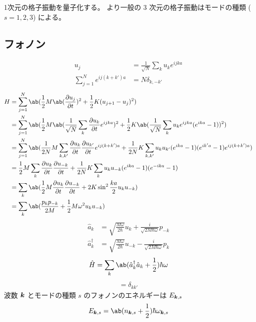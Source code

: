 \documentclass[uplatex,dvipdfmx,a4paper,11pt]{jlreq}
\begin{document}
1次元の格子振動を量子化する。
より一般の 3 次元の格子振動はモードの種類 ($s = 1, 2, 3$) による。

\subsection{フォノン}
\begin{align}
  u_j                            & = \frac{1}{\sqrt{N}}\sum_{k}u_ke^{ijka} \\
  \sum_{j = 1}^N e^{ij(k + k')a} & = N\delta_{k,-k'}
\end{align}
\begin{align}
  H & = \sum_{j = 1}^{N}\ab(\frac{1}{2}M\ab(\diffp{u_j}{t})^2 + \frac{1}{2}K(u_{j+1} - u_j)^2)                                                                                    \\
    & = \sum_{j = 1}^{N}\ab(\frac{1}{2}M\ab(\frac{1}{\sqrt{N}}\sum_{k}\diffp{u_k}{t}e^{ijka})^2 + \frac{1}{2}K\ab(\frac{1}{\sqrt{N}}\sum_{k}u_ke^{ijka}(e^{ika} - 1))^2)          \\
    & = \sum_{j = 1}^{N}\ab(\frac{1}{2N}M\sum_{k,k'}\diffp{u_k}{t}\diffp{u_{k'}}{t}e^{ij(k + k')a} + \frac{1}{2N}K\sum_{k,k'}u_ku_{k'}(e^{ika} - 1)(e^{ik'a} - 1)e^{ij(k + k')a}) \\
    & = \frac{1}{2}M\sum_{k}\diffp{u_k}{t}\diffp{u_{-k}}{t} + \frac{1}{2N}K\sum_{k}u_ku_{-k}(e^{ika} - 1)(e^{-ika} - 1)                                                           \\
    & = \sum_{k}\ab(\frac{1}{2}M\diffp{u_k}{t}\diffp{u_{-k}}{t} + 2K\sin^2\frac{ka}{2}u_ku_{-k})                                                                                  \\
    & = \sum_{k}\ab(\frac{p_{k}p_{-k}}{2M} + \frac{1}{2}M\omega^2u_ku_{-k})
\end{align}
\begin{align}
  \hat{a}_k         & = \sqrt{\frac{M\omega}{2\hbar}}u_k + \frac{i}{\sqrt{2M\hbar\omega}}p_{-k}   \\
  \hat{a}_k^\dagger & = \sqrt{\frac{M\omega}{2\hbar}}u_{-k} - \frac{i}{\sqrt{2M\hbar\omega}}p_{k}
\end{align}
\begin{align}
  \hat{H} = \sum_{k}\ab(\hat{a}_k^\dagger\hat{a}_k + \frac{1}{2})\hbar\omega
\end{align}
\begin{align}
  [a_k, a_{k'}^\dagger] = \delta_{kk'}
\end{align}
波数 $\bm{k}$ とモードの種類 $s$ のフォノンのエネルギーは $E_{\bm{k},s}$
\begin{align}
  E_{\kk,s} = \ab(n_{\kk,s} + \frac{1}{2})\hbar\omega_{\kk,s}
\end{align}
\end{document}
